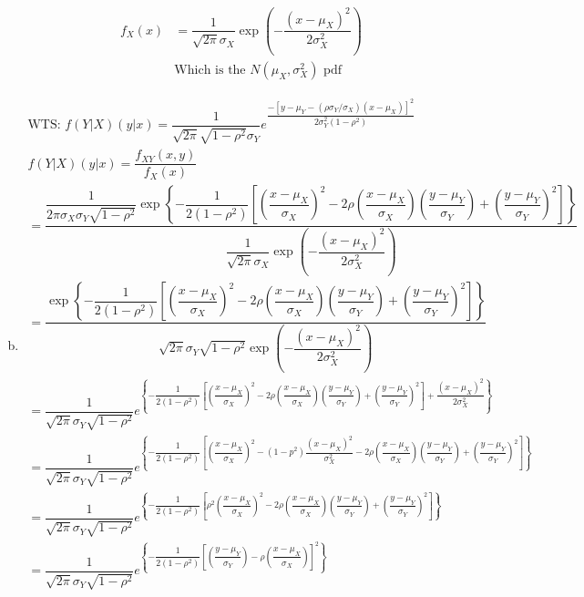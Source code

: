 \documentclass{article}
\begin{document}
\begin{flushleft}
\begin{enumerate}[(a)]
\begin{align*}
f_X(x)&=\dfrac{1}{\sqrt{2\pi}\sigma_X}\exp{\left(-\dfrac{(x-\mu_X)^2}{2\sigma_X^2}\right)}\\
&\text{Which is the } N(\mu_X,\sigma^2_X) \text{ pdf}
\end{align*}
\item 
\begin{multline*}
\text{WTS: } f(Y|X)(y|x)=\dfrac{1}{\sqrt{2\pi}\sqrt{1-\rho^2}\sigma_Y}e^{\dfrac{-[y-\mu_Y-(\rho\sigma_Y /\sigma_X)(x-\mu_X)]^2}{2\sigma^2_Y(1-\rho^2)}}\\
f(Y|X)(y|x)=\dfrac{f_{XY}(x,y)}{f_X(x)}\\
=\dfrac{\dfrac{1}{2\pi \sigma_X \sigma_Y \sqrt{1-\rho^2}}
	\exp{\left\{-\dfrac{1}{2(1-\rho^2)}\left[\left(\dfrac{x-\mu_X}{\sigma_X} \right)^2- 2\rho \left(\dfrac{x-\mu_X}{\sigma_X} \right)\left(\dfrac{y-\mu_Y}{\sigma_Y} \right)+\left(\dfrac{y-\mu_Y}{\sigma_Y} \right)^2 \right] \right\}}}{\dfrac{1}{\sqrt{2\pi}\sigma_X}\exp{\left(-\dfrac{(x-\mu_X)^2}{2\sigma_X^2}\right)}}\\
=\dfrac{\exp{\left\{-\dfrac{1}{2(1-\rho^2)}\left[\left(\dfrac{x-\mu_X}{\sigma_X} \right)^2- 2\rho \left(\dfrac{x-\mu_X}{\sigma_X} \right)\left(\dfrac{y-\mu_Y}{\sigma_Y} \right)+\left(\dfrac{y-\mu_Y}{\sigma_Y} \right)^2 \right] \right\}}}{\sqrt{2\pi}\sigma_Y \sqrt{1-\rho^2}\exp{\left(-\dfrac{(x-\mu_X)^2}{2\sigma_X^2}\right)}}\\
=\dfrac{1}{\sqrt{2\pi}\sigma_Y \sqrt{1-\rho^2}}e^{\left\{-\dfrac{1}{2(1-\rho^2)}\left[\left(\dfrac{x-\mu_X}{\sigma_X} \right)^2- 2\rho \left(\dfrac{x-\mu_X}{\sigma_X} \right)\left(\dfrac{y-\mu_Y}{\sigma_Y} \right)+\left(\dfrac{y-\mu_Y}{\sigma_Y} \right)^2 \right]+\dfrac{(x-\mu_X)^2}{2\sigma_X^2} \right\}}\\
=\dfrac{1}{\sqrt{2\pi}\sigma_Y \sqrt{1-\rho^2}}e^{\left\{-\dfrac{1}{2(1-\rho^2)}\left[\left(\dfrac{x-\mu_X}{\sigma_X} \right)^2-(1-p^2)\dfrac{(x-\mu_X)^2}{\sigma_X^2}- 2\rho \left(\dfrac{x-\mu_X}{\sigma_X} \right)\left(\dfrac{y-\mu_Y}{\sigma_Y} \right)+\left(\dfrac{y-\mu_Y}{\sigma_Y} \right)^2 \right] \right\}}\\
=\dfrac{1}{\sqrt{2\pi}\sigma_Y \sqrt{1-\rho^2}}e^{\left\{-\dfrac{1}{2(1-\rho^2)}\left[\rho^2\left(\dfrac{x-\mu_X}{\sigma_X} \right)^2- 2\rho \left(\dfrac{x-\mu_X}{\sigma_X} \right)\left(\dfrac{y-\mu_Y}{\sigma_Y} \right)+\left(\dfrac{y-\mu_Y}{\sigma_Y} \right)^2 \right] \right\}}\\
=\dfrac{1}{\sqrt{2\pi}\sigma_Y \sqrt{1-\rho^2}}e^{\left\{-\dfrac{1}{2(1-\rho^2)}\left[ \left(\dfrac{y-\mu_Y}{\sigma_Y} \right)-\rho\left(\dfrac{x-\mu_X}{\sigma_X} \right) \right]^2 \right\}}\\

\end{multline*}
\end{enumerate}
\end{flushleft}
\end{document}
